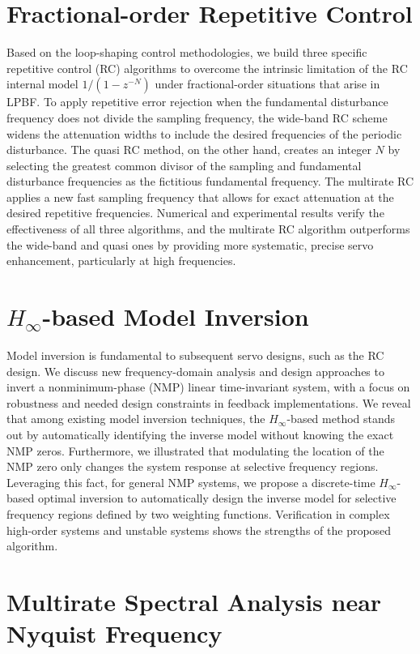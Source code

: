 \documentclass [11pt, proquest] {uwthesis}[2020/02/24]
\begin{document}
\section*{Fractional-order Repetitive Control}

Based on the loop-shaping control methodologies, we build three specific repetitive control (RC) algorithms to overcome the intrinsic limitation of the RC internal model $1/(1-z^{-N})$
under fractional-order situations that arise in LPBF. To apply repetitive error rejection when the
fundamental disturbance frequency does not divide the sampling frequency,
the wide-band RC scheme widens the attenuation widths to include the
desired frequencies of the periodic disturbance. The quasi RC method,
on the other hand, creates an integer $N$ by selecting the greatest
common divisor of the sampling and fundamental disturbance frequencies
as the fictitious fundamental frequency. The multirate RC applies
a new fast sampling frequency that allows for exact attenuation at
the desired repetitive frequencies. Numerical and experimental results
verify the effectiveness of all three algorithms, and the multirate
RC algorithm outperforms the wide-band and quasi ones by providing
more systematic, precise servo enhancement, particularly at high frequencies.

\section*{$H_\infty$-based Model Inversion}

Model inversion is fundamental to subsequent servo designs, such as the RC design. We discuss new frequency-domain analysis and design
approaches to invert a nonminimum-phase (NMP) linear time-invariant
system, with a focus on robustness and needed design constraints in
feedback implementations. We reveal that among existing model inversion
techniques, the $H_{\infty}$-based method stands out by automatically
identifying the inverse model without knowing the exact NMP zeros.
Furthermore, we illustrated that modulating the location of the NMP
zero only changes the system response at selective frequency regions.
Leveraging this fact, for general NMP systems, we propose a discrete-time
$H_{\infty}$-based optimal inversion to automatically design the
inverse model for selective frequency regions defined by two weighting
functions. Verification in complex high-order systems and unstable
systems shows the strengths of the proposed algorithm.

\section*{Multirate Spectral Analysis near Nyquist Frequency}
\end{document}
